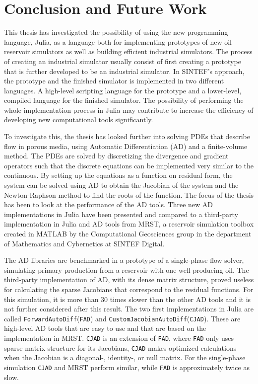 \chapter{Conclusion and Future Work}
\label{ch:Conclusion}
This thesis has investigated the possibility of using the new programming language, Julia, as a language both for implementing prototypes of new oil reservoir simulators as well as building efficient industrial simulators. The process of creating an industrial simulator usually consist of first creating a prototype that is further developed to be an industrial simulator. In SINTEF's approach, the prototype and the finished simulator is implemented in two different languages. A high-level scripting language for the prototype and a lower-level, compiled language for the finished simulator. The possibility of performing the whole implementation process in Julia may contribute to increase the efficiency of developing new computational tools significantly.

To investigate this, the thesis has looked further into solving PDEs that describe flow in porous media, using Automatic Differentiation (AD) and a finite-volume method. The PDEs are solved by discretizing the divergence and gradient operators such that the discrete equations can be implemented very similar to the continuous. By setting up the equations as a function on residual form, the system can be solved using AD to obtain the Jacobian of the system and the Newton-Raphson method to find the roots of the function. The focus of the thesis has been to look at the performance of the AD tools. Three new AD implementations in Julia have been presented and compared to a third-party implementation in Julia and AD tools from MRST, a reservoir simulation toolbox created in MATLAB by the Computational Geosciences group in the department of Mathematics and Cybernetics at SINTEF Digital\emph{\citep{mrstHomepage}}. 

The AD libraries are benchmarked in a prototype of a single-phase flow solver, simulating primary production from a reservoir with one well producing oil. The third-party implementation of AD, with its dense matrix structure, proved useless for calculating the sparse Jacobians that correspond to the residual functions. For this simulation, it is more than 30 times slower than the other AD tools and it is not further considered after this result. The two first implementations in Julia are called \texttt{ForwardAutoDiff}(\texttt{FAD}) and \texttt{CustomJacobianAutoDiff}(\texttt{CJAD}). These are high-level AD tools that are easy to use and that are based on the implementation in MRST. \texttt{CJAD} is an extension of \texttt{FAD}, where \texttt{FAD} only uses sparse matrix structure for its Jacobians, \texttt{CJAD} makes optimized calculations when the Jacobian is a diagonal-, identity-, or null matrix. For the single-phase simulation \texttt{CJAD} and MRST perform similar, while \texttt{FAD} is approximately twice as slow. 

